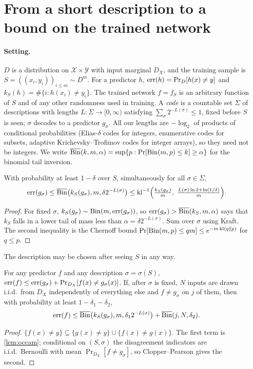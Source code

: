 \section{From a short description to a bound on the trained network}\label{sec:theory}

\paragraph{Setting.} $D$ is a distribution on $\mathcal X\times\mathcal Y$ with input marginal $D_X$, and the training sample is $S=((x_i,y_i))_{i\le m}\sim D^m$. For a predictor $h$, $\mathrm{err}(h)=\Pr_D[h(x)\ne y]$ and $k_S(h)=\#\{i:h(x_i)\ne y_i\}$. The trained network $f=f_S$ is an arbitrary function of $S$ and of any other randomness used in training. A \emph{code} is a countable set $\Sigma$ of descriptions with lengths $L:\Sigma\to[0,\infty)$ satisfying $\sum_\sigma 2^{-L(\sigma)}\le1$, fixed before $S$ is seen; $\sigma$ decodes to a predictor $g_\sigma$. All our lengths are $-\log_2$ of products of conditional probabilities (Elias-$\delta$ codes for integers, enumerative codes for subsets, adaptive Krichevsky--Trofimov codes for integer arrays), so they need not be integers. We write $\overline{\mathrm{Bin}}(k,m,\alpha)=\sup\{p:\Pr[\mathrm{Bin}(m,p)\le k]\ge\alpha\}$ for the binomial tail inversion.

\begin{lemma}\label{lem:occam}
With probability at least $1-\delta$ over $S$, simultaneously for all $\sigma\in\Sigma$,
\[
\err(g_\sigma)\le\Bin\big(k_S(g_\sigma),m,\delta2^{-L(\sigma)}\big)\le\kl^{-1}\Big(\tfrac{k_S(g_\sigma)}{m},\ \tfrac{L(\sigma)\ln2+\ln(1/\delta)}{m}\Big).
\]
\end{lemma}
\begin{proof}
For fixed $\sigma$, $k_S(g_\sigma)\sim\mathrm{Bin}(m,\mathrm{err}(g_\sigma))$, so $\mathrm{err}(g_\sigma)>\overline{\mathrm{Bin}}(k_S,m,\alpha)$ says that $k_S$ falls in a lower tail of mass less than $\alpha=\delta2^{-L(\sigma)}$. Sum over $\sigma$ using Kraft. The second inequality is the Chernoff bound $\Pr[\mathrm{Bin}(m,p)\le qm]\le e^{-m\,\mathrm{kl}(q\|p)}$ for $q\le p$.
\end{proof}
The description may be chosen after seeing $S$ in any way.

\begin{theorem}\label{thm:reduction}
For any predictor $f$ and any description $\sigma=\sigma(S)$, $\mathrm{err}(f)\le\mathrm{err}(g_\sigma)+\Pr_{D_X}[f(x)\ne g_\sigma(x)]$. If, after $\sigma$ is fixed, $N$ inputs are drawn i.i.d.\ from $D_X$ independently of everything else and $f\ne g_\sigma$ on $j$ of them, then with probability at least $1-\delta_1-\delta_2$,
\[
\mathrm{err}(f)\le\overline{\mathrm{Bin}}\big(k_S(g_\sigma),m,\delta_12^{-L(\sigma)}\big)+\overline{\mathrm{Bin}}(j,N,\delta_2).
\]
\end{theorem}
\begin{proof}
$\{f(x)\ne y\}\subseteq\{g(x)\ne y\}\cup\{f(x)\ne g(x)\}$. The first term is \cref{lem:occam}; conditional on $(S,\sigma)$ the disagreement indicators are i.i.d.\ Bernoulli with mean $\Pr_{D_X}[f\ne g_\sigma]$, so Clopper--Pearson gives the second.
\end{proof}

